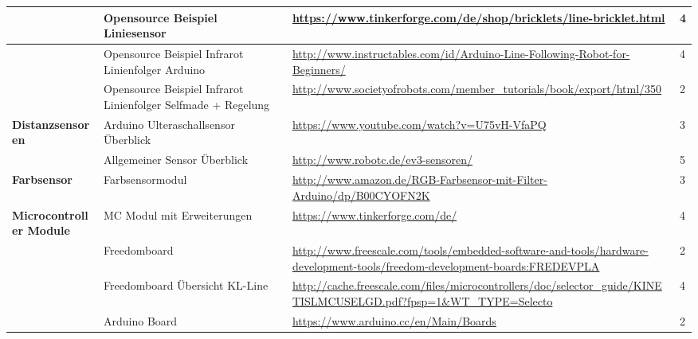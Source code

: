 \begin{tabular}{|p{3cm}|p{3.5cm}|p{5cm}|p{2cm}|}\hline
				 			&	Opensource Beispiel Liniesensor	&	\url{https://www.tinkerforge.com/de/shop/bricklets/line-bricklet.html}	&	4 \\\hline
 				 			&	Opensource Beispiel Infrarot Linienfolger Arduino	&	\url{http://www.instructables.com/id/Arduino-Line-Following-Robot-for-Beginners/}	&	4 \\\hline
 				 			&	Opensource Beispiel Infrarot Linienfolger Selfmade + Regelung	&	\url{http://www.societyofrobots.com/member_tutorials/book/export/html/350}	&	2 \\\hline
 \textbf{Distanzsensoren}	&	Arduino Ulteraschallsensor Überblick &	\url{https://www.youtube.com/watch?v=U75vH-VfaPQ}	&	3 \\\hline	
 							&	Allgemeiner Sensor Überblick &	\url{http://www.robotc.de/ev3-sensoren/}	&	5 \\\hline	


\textbf{Farbsensor}	&	Farbsensormodul	&	\url{http://www.amazon.de/RGB-Farbsensor-mit-Filter-Arduino/dp/B00CYOFN2K}	&	3 \\\hline			 		
\textbf{Microcontroller Module}	&	MC Modul mit Erweiterungen	&	\url{https://www.tinkerforge.com/de/}	&	4 \\\hline
					&	Freedomboard	&	\url{http://www.freescale.com/tools/embedded-software-and-tools/hardware-development-tools/freedom-development-boards:FREDEVPLA}	&	2 \\\hline
					&	Freedomboard Übersicht KL-Line	&	\url{http://cache.freescale.com/files/microcontrollers/doc/selector_guide/KINETISLMCUSELGD.pdf?fpsp=1&WT_TYPE=Selecto}	&	4 \\\hline
					&	Arduino Board &	\url{https://www.arduino.cc/en/Main/Boards}	&	2 \\\hline					
					

\end{tabular}
